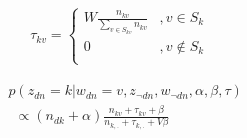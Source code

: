 \documentclass{sig-alternate-05-2015}
\begin{document}
\begin{equation}
\label{eq:wikiPrior}
\begin{aligned}
\tau_{kv}=
\left\{ \begin{aligned}
W \frac{n_{kv}}{\sum_{v\in S_{kv}}n_{kv}} &,v\in S_{k} \\
0&,v \notin S_{k}\\
\end{aligned}\right.
\end{aligned}
\end{equation}

\begin{equation}
\label{eq:LDAgibbs}
\begin{aligned}
&p(z_{dn}=k|w_{dn}=v,z_{\neg{dn}},w_{\neg{dn}},\alpha,\beta,\tau)\\
&\ \ \propto (n_{dk}+\alpha)\frac{n_{kv}+\tau_{kv}+\beta}{n_{k,.}+\tau_{k,.}+V\beta}
\end{aligned}
\end{equation}

\end{document}
